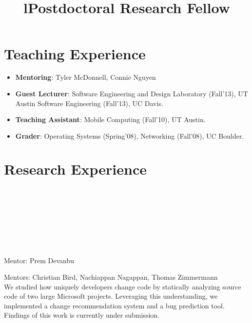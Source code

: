 \documentclass[overlapped,line,letterpaper, 12pt]{res}
\begin{document}
\begin{resume}
\section{\bf Teaching Experience}
\vspace{1cm}
\begin{itemize}
\item
{\bf Mentoring}: Tyler McDonnell, Connie Nguyen
\item
{\bf Guest Lecturer}: Software Engineering and Design Laboratory (Fall'13), UT Austin
                                 Software Engineering (Fall'13), UC Davis.
\item 
{\bf Teaching Assistant}: Mobile Computing (Fall'10), UT Austin.
\item
{\bf Grader}: Operating Systems (Spring'08), Networking (Fall'08), UC Boulder.
\end{itemize}

\section{\bf Research Experience}
\begin{format}
 \\
\body\\
\end{format}
\vspace{0.5cm}

\begin{format}
\\
\title{l} \\
\body\\
\end{format}
\vspace{0.5cm}

\title{{Postdoctoral Research Fellow}}
\begin{position}
Mentor: Prem Devanbu \\
\end{position} 

\vspace{-1cm}



\begin{position}
Mentors: Christian Bird, Nachiappan Nagappan, Thomas Zimmermann \\
We studied how uniquely developers change code by statically analyzing source code of two large Microsoft projects.
Leveraging this understanding, we implemented a change recommendation system and a bug prediction tool.
Findings of this work is currently under submission.
\end{position}


\end{resume}
\end{document}
